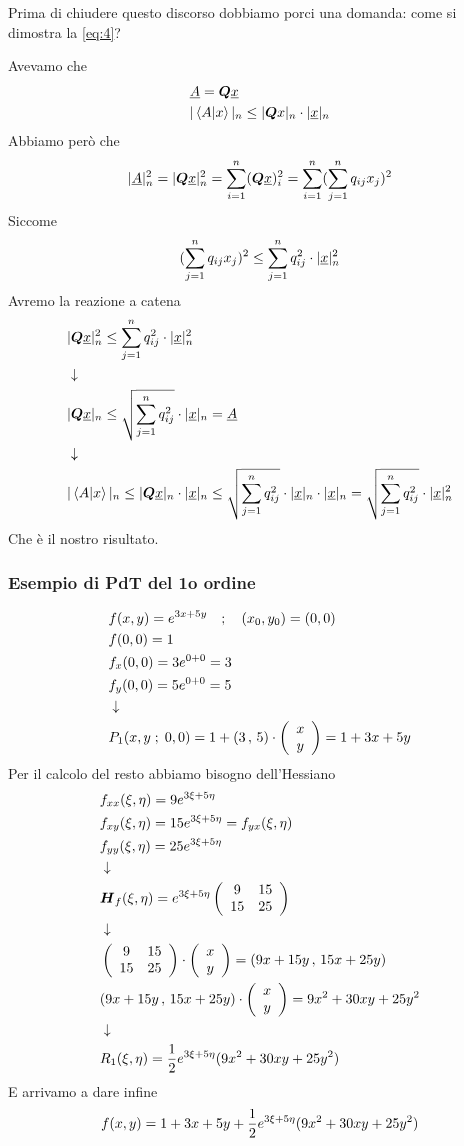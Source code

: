 \newpage

Prima di chiudere questo discorso dobbiamo porci una domanda: come si dimostra la \ref{eq:4}?

Avevamo che
\begin{align}
	&\underline{A}= \boldsymbol{Q} \underline{x}\\
	&|\braket{A|x}|_n\leq |\boldsymbol{Q} x|_n \cdot |\underline{x}|_n
\end{align}
Abbiamo però che
\begin{align}
	|\underline{A}|^2_n=|\boldsymbol{Q} \underline{x}|_n^2 = \sum_{i=1}^{n} (\boldsymbol{Q} \underline{x})_i^2 = \sum_{i=1}^{n} (\sum_{j=1}^{n}q_{ij}x_j)^2
\end{align}
Siccome
\begin{align}
	(\sum_{j=1}^{n}q_{ij}x_j)^2 \leq \sum_{j=1}^{n}q_{ij}^2 \cdot |\underline{x}|_n^2
\end{align}
Avremo la reazione a catena
\begin{align}
	&|\boldsymbol{Q} \underline{x}|_n^2 \leq \sum_{j=1}^{n}q_{ij}^2 \cdot |\underline{x}|_n^2 \nonumber \\ &\downarrow \nonumber \\
	&|\boldsymbol{Q} \underline{x}|_n \leq \sqrt{\sum_{j=1}^{n}q_{ij}^2} \cdot |\underline{x}|_n = \underline{A} \nonumber \\ &\downarrow \nonumber \\
	&|\braket{A|x}|_n\leq |\boldsymbol{Q} \underline{x}|_n \cdot |\underline{x}|_n \leq 
	\sqrt{\sum_{j=1}^{n}q_{ij}^2} \cdot |\underline{x}|_n \cdot |\underline{x}|_n = \sqrt{\sum_{j=1}^{n}q_{ij}^2} \cdot |\underline{x}|_n^2 
\end{align}
Che è il nostro risultato.



\subsubsection{Esempio di PdT del 1o ordine}

\begin{align}
	&f(x,y)= e^{3x + 5y} \quad ; \quad (x_0,y_0)=(0,0) \\
	&f(0,0)=1 \nonumber \\
	&f_x(0,0)=3 e^{0+0} = 3 \nonumber \\
	&f_y(0,0)=5 e^{0+0} = 5 \nonumber \\ &\downarrow \nonumber \\
	&P_1(x,y \; ; \; 0,0) = 1 + (3 \, , \, 5) \cdot \left( \begin{array}{cc} x \\ y \end{array} \right) = 1 + 3x + 5y
\end{align}
Per il calcolo del resto abbiamo bisogno dell'Hessiano
\begin{align}
	& f_{xx}(\xi,\eta)= 9 e^{3\xi + 5\eta} \nonumber \\
	& f_{xy}(\xi,\eta) = 15 e^{3\xi + 5\eta} = f_{yx}(\xi,\eta)\nonumber \\
	& f_{yy}(\xi,\eta) = 25 e^{3\xi + 5\eta} \nonumber \\ &\downarrow \nonumber \\
	&\boldsymbol{H}_{f} (\xi ,\eta)= e^{3\xi + 5\eta} \left( \begin{array}{ccc} 9 & 15 \\ 15 & 25 \end{array} \right) \nonumber \\ &\downarrow \nonumber \\
	&\left( \begin{array}{ccc} 9 & 15 \\ 15 & 25 \end{array} \right) \cdot  \left( \begin{array}{cc} x \\ y \end{array} \right) =  (9x + 15 y \, , \, 15x + 25 y) \nonumber \\
	&(9x + 15 y \, , \, 15x + 25 y) \cdot \left( \begin{array}{cc} x \\ y \end{array} \right) = 9x^2 + 30 xy + 25 y^2 \nonumber \\ &\downarrow \nonumber \\
	&R_1(\xi,\eta) = \frac{1}{2} e^{3\xi + 5\eta} (9x^2 + 30 xy + 25 y^2 )
\end{align}
E arrivamo a dare infine
\begin{align}
	f(x,y)= 1 + 3x + 5y + \frac{1}{2} e^{3\xi + 5\eta} (9x^2 + 30 xy + 25 y^2)
\end{align}

